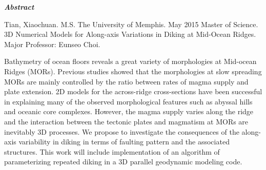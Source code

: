 \begin{center}
\textbf{\textit{Abstract}}
\end{center}

\vspace{0.5cm}

\begin{singlespace*}
Tian, Xiaochuan. M.S. The University of Memphis. May 2015 Master of Science. 3D Numerical Models for Along-axis Variations in Diking at Mid-Ocean Ridges. Major Professor: Eunseo Choi.
\end{singlespace*}

\vspace{0.5cm}

Bathymetry of ocean floors reveals a great variety of morphologies at Mid-ocean Ridges (MORs). Previous studies showed that the morphologies at slow spreading MORs are mainly controlled by the ratio between rates of magma supply and plate extension. 2D models for the across-ridge cross-sections have been successful in explaining many of the observed morphological features such as abyssal hills and oceanic core complexes. However, the magma supply varies along the ridge and the interaction between the tectonic plates and magmatism at MORs are inevitably 3D processes. We propose to investigate the consequences of the along-axis variability in diking in terms of faulting pattern and the associated structures. This work will include implementation of an algorithm of parameterizing repeated diking in a 3D parallel geodynamic modeling code.


